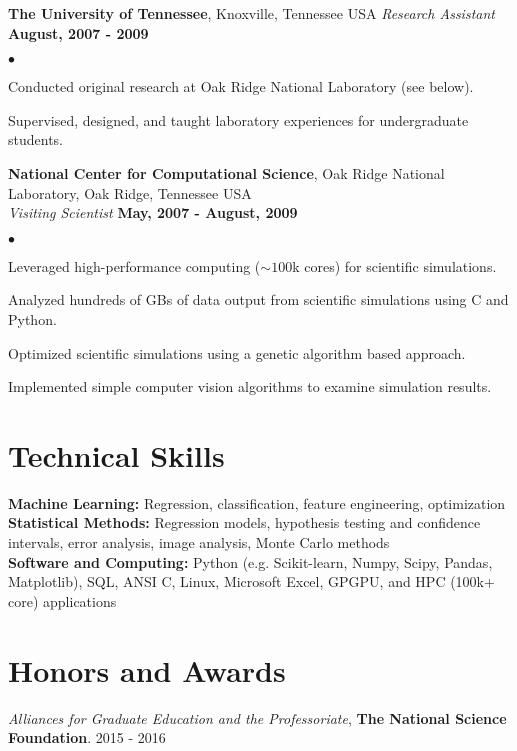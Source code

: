\documentclass[margin,line, 11pt]{res}
\newenvironment{list2}{
  \begin{list}{$\bullet$}{%
      \setlength{\itemsep}{0in}
      \setlength{\parsep}{0in} \setlength{\parskip}{0in}
      \setlength{\topsep}{0in} \setlength{\partopsep}{0in} 
      \setlength{\leftmargin}{0.2in}}}{\end{list}}
\begin{document}
\begin{resume}
\textbf{The University of Tennessee}, Knoxville, Tennessee USA\newline
\textit{Research Assistant} \hfill \textbf{August, 2007 - 2009}\newline
    \begin{list2}
    	\vspace*{-5mm}
    	\item Conducted original research at Oak Ridge National Laboratory (see below).
    	\item Supervised, designed, and taught laboratory experiences for undergraduate students.
    \end{list2}
\vspace*{-4mm}

\textbf{National Center for Computational Science}, Oak Ridge National Laboratory, Oak Ridge, Tennessee USA\\
\textit{Visiting Scientist} \hfill \textbf{May, 2007 - August, 2009}\\
    \begin{list2}
    	\vspace*{-5mm}
    	\item Leveraged high-performance computing ($\sim 100$k cores) for scientific simulations.
    	\item Analyzed hundreds of GBs of data output from scientific simulations using C and Python.
    	\item Optimized scientific simulations using a genetic algorithm based approach.
    	\item Implemented simple computer vision algorithms to examine simulation results.
    \end{list2}
\vspace*{-5mm}

\section{Technical Skills}
\textbf{Machine Learning:} Regression, classification, feature engineering, optimization\\
\textbf{Statistical Methods:} Regression models, hypothesis testing and confidence intervals, error analysis, image analysis, Monte Carlo methods\\
\textbf{Software and Computing:}  Python (e.g. Scikit-learn, Numpy, Scipy, Pandas, Matplotlib), SQL, ANSI C, Linux, Microsoft Excel, GPGPU, and HPC (100k+ core) applications\\
\vspace*{-10mm}

\section{Honors and Awards}
\textit{Alliances for Graduate Education and the Professoriate}, \textbf{The National Science Foundation}. \hfill 2015 - 2016

\end{resume}
\end{document}
